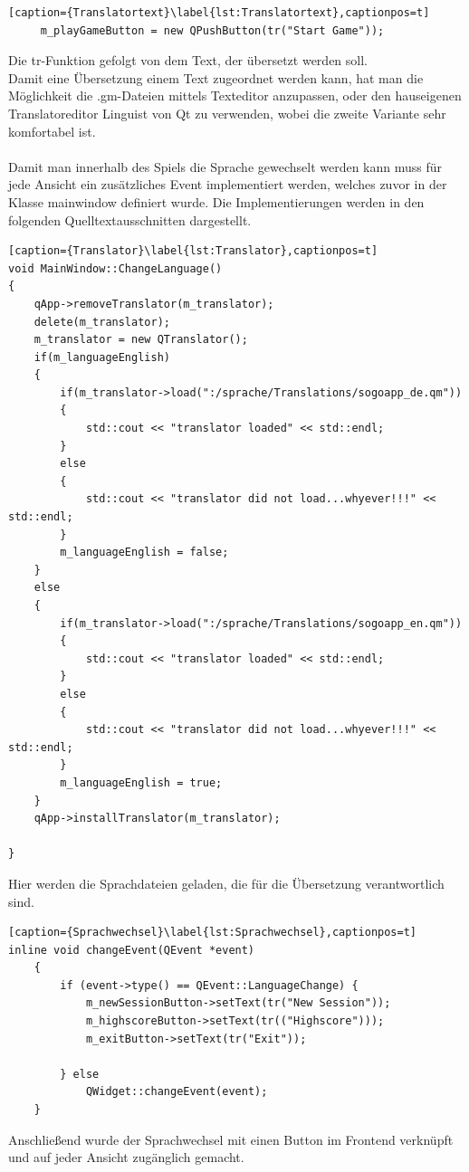 \documentclass[a4paper]{scrartcl}
\begin{document}
\begin{lstlisting}[caption={Translatortext}\label{lst:Translatortext},captionpos=t]
     m_playGameButton = new QPushButton(tr("Start Game"));
\end{lstlisting}
Die tr-Funktion gefolgt von dem Text, der übersetzt werden soll. 
\\
Damit eine Übersetzung einem Text zugeordnet werden kann, hat man die Möglichkeit die .gm-Dateien mittels Texteditor anzupassen, oder den hauseigenen Translatoreditor Linguist von Qt zu verwenden, wobei die zweite Variante sehr komfortabel ist.
\\ 
\\
Damit man innerhalb des Spiels die Sprache gewechselt werden kann muss für jede Ansicht ein zusätzliches Event implementiert werden, welches zuvor in der Klasse mainwindow definiert wurde. Die Implementierungen werden in den folgenden Quelltextausschnitten dargestellt.

\begin{lstlisting}[caption={Translator}\label{lst:Translator},captionpos=t]
void MainWindow::ChangeLanguage()
{
    qApp->removeTranslator(m_translator);
    delete(m_translator);
    m_translator = new QTranslator();
    if(m_languageEnglish)
    {
        if(m_translator->load(":/sprache/Translations/sogoapp_de.qm"))
        {
            std::cout << "translator loaded" << std::endl;
        }
        else
        {
            std::cout << "translator did not load...whyever!!!" << std::endl;
        }
        m_languageEnglish = false;
    }
    else
    {
        if(m_translator->load(":/sprache/Translations/sogoapp_en.qm"))
        {
            std::cout << "translator loaded" << std::endl;
        }
        else
        {
            std::cout << "translator did not load...whyever!!!" << std::endl;
        }
        m_languageEnglish = true;
    }
    qApp->installTranslator(m_translator);

}
\end{lstlisting}
Hier werden die Sprachdateien geladen, die für die Übersetzung verantwortlich sind.

\begin{lstlisting}[caption={Sprachwechsel}\label{lst:Sprachwechsel},captionpos=t]
inline void changeEvent(QEvent *event)
    {
        if (event->type() == QEvent::LanguageChange) {
            m_newSessionButton->setText(tr("New Session"));
            m_highscoreButton->setText(tr(("Highscore")));
            m_exitButton->setText(tr("Exit"));

        } else
            QWidget::changeEvent(event);
    }
\end{lstlisting}
Anschließend wurde der Sprachwechsel mit einen Button im Frontend verknüpft und auf jeder Ansicht zugänglich gemacht.
\end{document}

